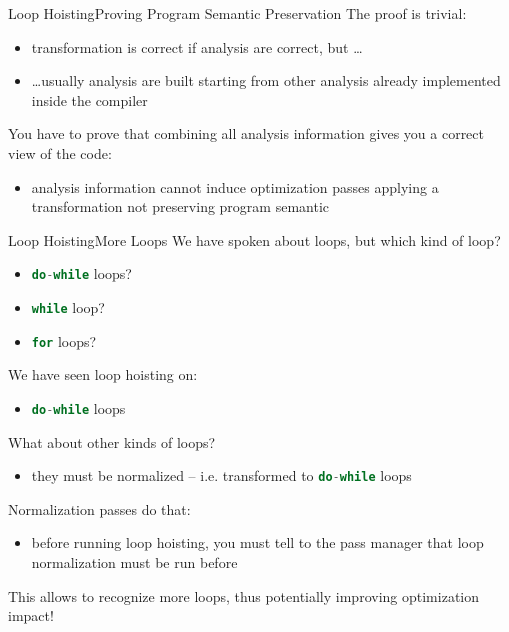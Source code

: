 \documentclass[10pt,mathserif]{beamer}
\newcommand{\cinline}[1]{\lstinline[language=C]!#1!}
\begin{document}
\begin{frame}{Loop Hoisting}{Proving Program Semantic Preservation}
	The \alert{proof} is trivial:
	
	\begin{itemize}
		\item transformation is correct if analysis are correct, but \ldots
		\item \ldots usually analysis are built starting from other analysis already
		implemented inside the compiler
	\end{itemize}
	\vfill
	You have to prove that combining all analysis information gives you a
	correct view of the code:
	
	\begin{itemize}
		\item analysis information cannot induce optimization passes applying a
		transformation not preserving program semantic
	\end{itemize}
\end{frame}

\begin{frame}{Loop Hoisting}{More Loops}
	We have spoken about loops, but which kind of loop?
	
	\begin{itemize}
		\item \cinline{do-while} loops?
		\item \cinline{while} loop?
		\item \cinline{for} loops?
	\end{itemize}
	
	We have seen loop hoisting on:
	
	\begin{itemize}
		\item \cinline{do-while} loops
	\end{itemize}
	
	What about other kinds of loops?
	
	\begin{itemize}
		\item they must be normalized -- i.e. transformed to \cinline{do-while} loops
	\end{itemize}
	
	\alert{Normalization passes} do that:
	
	\begin{itemize}
		\item before running loop hoisting, you must tell to the pass manager that loop
		normalization must be run before
	\end{itemize}
	
	This allows to recognize more loops, thus potentially improving \alert{optimization
	impact}!
\end{frame}
\end{document}
